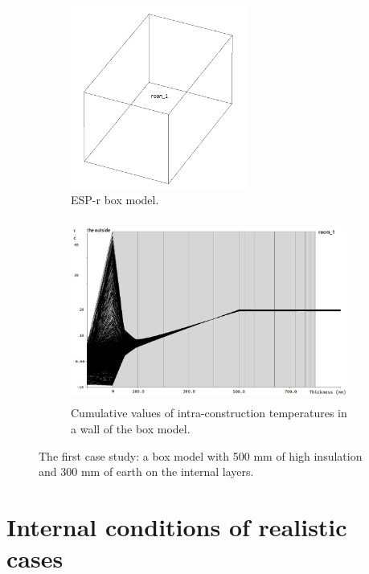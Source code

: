 \documentclass[10pt]{extarticle} %
\begin{document}


 
\begin{figure}[h]
 
\begin{subfigure}{0.35\textwidth}
\includegraphics[width=0.95\linewidth, height=6cm]{images/Dead02_boxModel.png} 
\caption{ESP-r box model.}
\label{fig:esprmodel}
\end{subfigure}
\begin{subfigure}{0.65\textwidth}
\includegraphics[width=0.95\linewidth, height=6cm]{images/01Feb_28Feb_Wall1_dead02_krita.jpg}
\caption{Cumulative values of intra-construction temperatures in a wall of the box model.}
\label{fig:constructionelements}
\end{subfigure}
 
\caption{The first case study: a box model with 500 mm of high  insulation and 300 mm of earth on the internal layers.}
\label{fig:casestudy}
\end{figure}


\vfill \break




\section{Internal conditions of realistic cases} \label{subsec:moreComplex}
\end{document}
